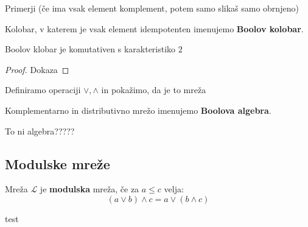 \documentclass[slovene]{beamer}
\begin{document}
\begin{frame}
Primerji (če ima vsak element komplement, potem samo slikaš samo obrnjeno)
\end{frame}

\begin{frame}%
\begin{definition}
Kolobar, v katerem je vsak element idempotenten imenujemo \textbf{Boolov kolobar}.
\end{definition}
\end{frame}


\begin{frame}
\begin{theorem}
Boolov klobar je komutativen s karakteristiko $2$
\end{theorem}

\begin{proof}
Dokaza
\end{proof}
\end{frame}

\begin{frame}
\begin{block}{}
Definiramo operaciji $\lor, \land$ in pokažimo, da je to mreža
\end{block}
\end{frame}


\begin{frame}
\begin{definition}
Komplementarno in distributivno mrežo imenujemo \textbf{Boolova algebra}.
\end{definition}

\begin{block}{}
To ni algebra?????
\end{block}
\end{frame}

\begin{frame}
\section{Modulske mreže}
\begin{definition}
Mreža $\mathcal{L}$ je \textbf{modulska} mreža, če za $a \leq c$ velja:
$$(a \lor b) \land c = a \lor (b \land c)$$
\end{definition}
\end{frame}


\begin{frame}
test
\end{frame}
\end{document}
